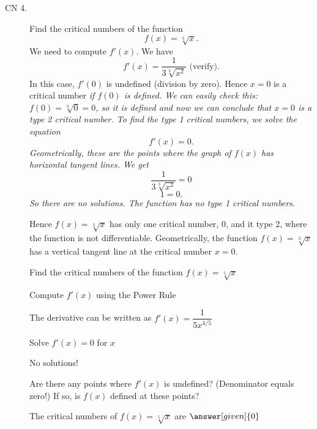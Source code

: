 \documentclass{ximera}
\begin{document}
\begin{description}
\begin{question}
\end{question}




\item[CN 4.] Find the critical numbers of the function 
\[f(x) = \sqrt[3] x.\]
We need to compute $f'(x)$.  We have
\[f'(x) = \frac{1}{3\sqrt[3]{x^2}} \text{   (verify)}.\]
In this case, $f'(0)$ is undefined (division by zero). Hence $x=0$ is a critical number \it{if}
$f(0)$ is defined.  We can easily check this: $f(0) = \sqrt[3] 0 = 0$, so it is defined and now we can conclude 
that $x=0$ is a type 2 critical number.
To find the type 1 critical numbers, we solve the equation
\[f'(x) = 0.\]
Geometrically, these are the points where the graph of $f(x)$ has horizontal tangent lines.
We get
\[ \frac{1}{3\sqrt[3]{x^2}} =0\]
\[ 1 =0.\]
So there are no solutions.  The function has no type 1 critical numbers.


Hence $f(x) = \sqrt[3] x$ has only one critical number, 0, and it type 2, 
where the function is not differentiable. 
Geometrically, the function $f(x) = \sqrt[3] x$ has a vertical tangent line at the critical number $x = 0$.


\begin{question} %
  Find the critical numbers of the function $f(x) = \sqrt[5] x$
  
  \begin{explanation}
    \begin{hint}
      Compute $f'(x)$ using the Power Rule
    \end{hint}
    \begin{hint}
      The derivative can be written as $f'(x) = \dfrac{1}{5x^{4/5}}$
    \end{hint}
		\begin{hint}
      Solve $f'(x) = 0$ for $x$
    \end{hint}
		\begin{hint}
      No solutions!
    \end{hint}
    \begin{hint}
      Are there any points where $f'(x)$ is undefined? (Denominator equals zero!)
      If so, is $f(x)$ defined at these points?  
		\end{hint}
    
    
		The critical numbers of $f(x) = \sqrt[5] x$ are
		 $\answer[given]{0}$
		\end{explanation}
\end{question}




\end{description}
\end{document}
